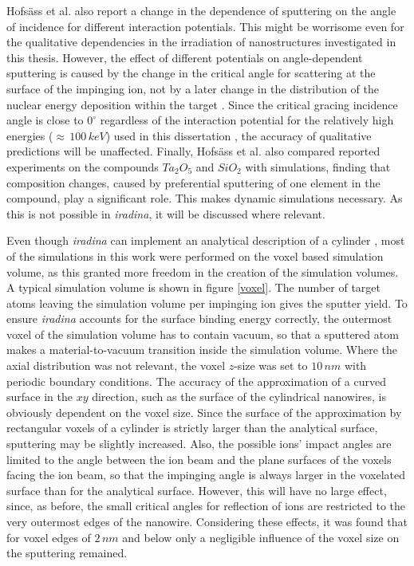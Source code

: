 Hofsäss et al. \cite{hofsass_simulation_2014} also report a change in the dependence of sputtering on the angle of incidence for different interaction potentials. This might be worrisome even for the qualitative dependencies in the irradiation of nanostructures investigated in this thesis. However, the effect of different potentials on angle-dependent sputtering is caused by the change in the critical angle for scattering at the surface of the impinging ion, not by a later change in the distribution of the nuclear energy deposition within the target \cite{eckstein_influence_1992}. Since the critical gracing incidence angle is close to $0^\circ$ regardless of the interaction potential for the relatively high energies ($\approx\,100\,keV$) used in this dissertation \cite{yamamura_empirical_1984}, the accuracy of qualitative predictions will be unaffected. Finally, Hofsäss et al. \cite{hofsass_simulation_2014} also compared reported experiments on the compounds $Ta_2O_5$ and $SiO_2$ with simulations, finding that composition changes, caused by preferential sputtering of one element in the compound, play a significant role. This makes dynamic simulations necessary. As this is not possible in \emph{iradina}, it will be discussed where relevant.


Even though \emph{iradina} can implement an analytical description of a cylinder \cite{borschel_ion-solid_2012}, most of the simulations in this work were performed on the voxel based simulation volume, as this granted more freedom in the creation of the simulation volumes. A typical simulation volume is shown in figure \ref{voxel}. The number of target atoms leaving the simulation volume per impinging ion gives the sputter yield. To ensure \emph{iradina} accounts for the surface binding energy correctly, the outermost voxel of the simulation volume has to contain vacuum, so that a sputtered atom makes a material-to-vacuum transition inside the simulation volume. Where the axial distribution was not relevant, the voxel $z$-size was set to $10\,nm$ with periodic boundary conditions. The accuracy of the approximation of a curved surface in the $xy$ direction, such as the surface of the cylindrical nanowires, is obviously dependent on the voxel size. Since the surface of the approximation by rectangular voxels of a cylinder is strictly larger than the analytical surface, sputtering may be slightly increased. Also, the possible ions' impact angles are limited to the angle between the ion beam and the plane surfaces of the voxels facing the ion beam, so that the impinging angle is always larger in the voxelated surface than for the analytical surface. However, this will have no large effect, since, as before, the small critical angles for reflection of ions are restricted to the very outermost edges of the nanowire. Considering these effects, it was found that for voxel edges of $2\,nm$ and below only a negligible influence of the voxel size on the sputtering remained. 

